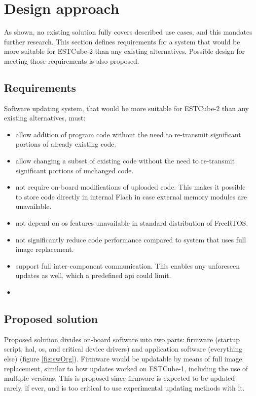 \newpage
\section{Design approach}
\label{s:design}

As shown, no existing solution fully covers described use cases, and this mandates further research. This section defines requirements for a system that would be more suitable for ESTCube-2 than any existing alternatives. Possible design for meeting those requirements is also proposed.

\subsection{Requirements}

Software updating system, that would be more suitable for ESTCube-2 than any existing alternatives, must:

\begin{itemize}
	\item allow addition of program code without the need to re-transmit significant portions of already existing code.
	\item allow changing a subset of existing code without the need to re-transmit significant portions of unchanged code.
	\item not require on-board modifications of uploaded code. This makes it possible to store code directly in internal Flash in case external memory modules are unavailable.
	\item not depend on \gls{os} features unavailable in standard distribution of FreeRTOS.
	\item not significantly reduce code performance compared to system that uses full image replacement.
	\item support full inter-component communication. This enables any unforeseen updates as well, which a predefined \gls{api} could limit.
	\item {}
\end{itemize}

\subsection{Proposed solution}

Proposed solution divides on-board software into two parts: firmware (startup script, \gls{hal}, \gls{os}, and critical device drivers) and application software (everything else) (figure \ref{fig:swOrg}). Firmware would be updatable by means of full image replacement, similar to how updates worked on ESTCube-1, including the use of multiple versions. This is proposed since firmware is expected to be updated rarely, if ever, and is too critical to use experimental updating methods with it.

